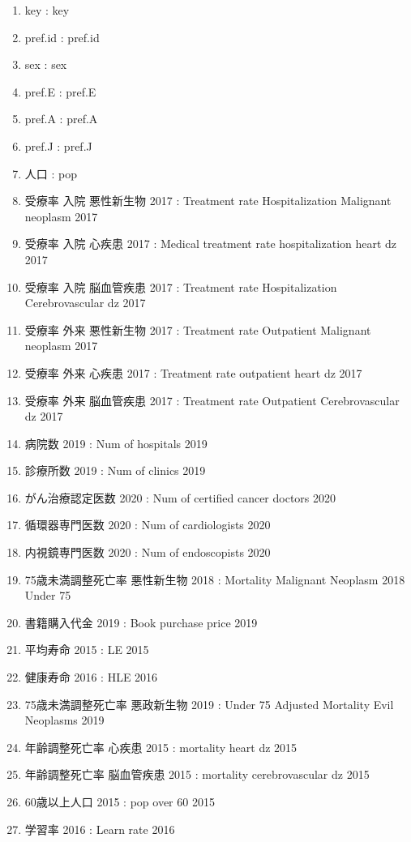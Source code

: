 \begin{enumerate}
  \item key  :  key
  \item pref.id  :  pref.id
  \item sex  :  sex
  \item pref.E  :  pref.E
  \item pref.A  :  pref.A
  \item pref.J  :  pref.J
  \item 人口  :  pop
  \item 受療率 入院 悪性新生物 2017  :  Treatment rate Hospitalization Malignant neoplasm 2017
  \item 受療率 入院 心疾患 2017  :  Medical treatment rate hospitalization heart dz 2017
  \item 受療率 入院 脳血管疾患 2017  :  Treatment rate Hospitalization Cerebrovascular dz 2017
  \item 受療率 外来 悪性新生物 2017  :  Treatment rate Outpatient Malignant neoplasm 2017
  \item 受療率 外来 心疾患 2017  :  Treatment rate outpatient heart dz 2017
  \item 受療率 外来 脳血管疾患 2017  :  Treatment rate Outpatient Cerebrovascular dz 2017
  \item 病院数 2019  :  Num of hospitals 2019
  \item 診療所数 2019  :  Num of clinics 2019
  \item がん治療認定医数 2020  :  Num of certified cancer doctors 2020
  \item 循環器専門医数 2020  :  Num of cardiologists 2020
  \item 内視鏡専門医数 2020  :  Num of endoscopists 2020
  \item 75歳未満調整死亡率 悪性新生物 2018  :  Mortality Malignant Neoplasm 2018 Under 75
  \item 書籍購入代金 2019  :  Book purchase price 2019
  \item 平均寿命 2015  :  LE 2015
  \item 健康寿命 2016  :  HLE 2016
  \item 75歳未満調整死亡率 悪政新生物 2019  :  Under 75 Adjusted Mortality Evil Neoplasms 2019
  \item 年齢調整死亡率 心疾患 2015  :  mortality heart dz 2015
  \item 年齢調整死亡率 脳血管疾患 2015  :  mortality cerebrovascular dz 2015
  \item 60歳以上人口 2015  :  pop over 60 2015
  \item 学習率 2016  :  Learn rate 2016

\end{enumerate}
